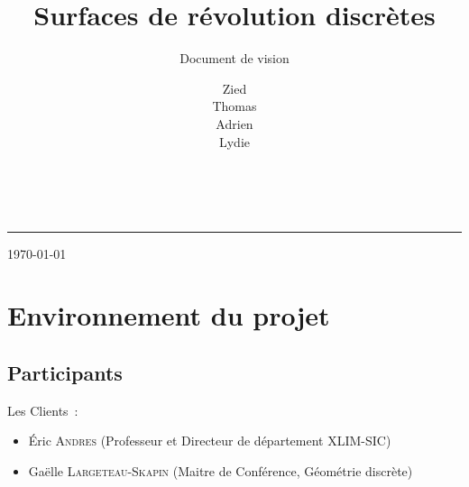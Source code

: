 \documentclass{scrartcl}
\title{Surfaces de révolution discrètes}
\subtitle{Document de vision}
\author{
	Zied \bsc{Ben Othmane}\\
	Thomas \bsc{Benoist}\\
	Adrien \bsc{Bisutti}\\
	Lydie \bsc{Richaume}
}
\makeatletter
\let\titleName\@title
\let\subtitleName\@subtitle
\let\authorName\@author
\makeatother
\begin{document}

\begin{titlepage}
	
	\begin{center}
		\fontsize{30}{36}\selectfont\bfseries
		\titleName\\
		\rule{6cm}{0.5pt} %
	\end{center}
	
	\begin{center}
		\LARGE
		\subtitleName
	\end{center}
	\vspace{1cm}
	
	\begin{center}
		\authorName
	\end{center}
	
	\begin{center}
		\today
	\end{center}
\end{titlepage}
\newpage




\tableofcontents
\newpage




\section{Environnement du projet}
	\subsection{Participants}
		\noindent
		Les Clients~:
			\begin{itemize}
				\item Éric \textsc{Andres} (Professeur et Directeur de département XLIM-SIC)
				\item Gaëlle \textsc{Largeteau-Skapin} (Maitre de Conférence, Géométrie discrète)
			\end{itemize}
		\medskip %
		
\end{document}

